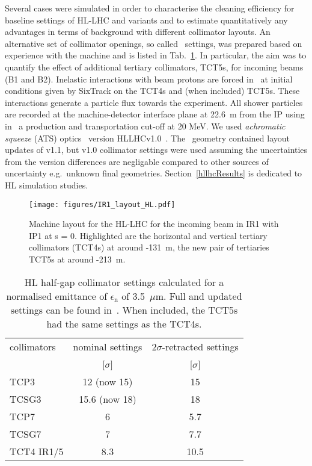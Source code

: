 Several cases were simulated in order to characterise the cleaning efficiency for baseline settings of HL-LHC and variants and to estimate quantitatively any advantages in terms of background with different collimator layouts. An alternative set of collimator openings, so called \twosigmaret~settings, was prepared based on experience with the machine and is listed in Tab.~\ref{HLcollSettings}. In particular, the aim was to quantify the effect of additional tertiary collimators, TCT5s, for incoming beams (B1 and B2). Inelastic interactions with beam protons are forced in \fluka~at initial conditions given by SixTrack on the TCT4s and (when included) TCT5s. These interactions generate a particle flux towards the experiment. All shower particles are recorded at the machine-detector interface plane at 22.6~m from the IP using in \fluka~a production and transportation cut-off at 20 MeV. We used \textit{achromatic squeeze} (ATS) optics~\cite{ATSref} version HLLHCv1.0~\cite{opticsWebRef}. The \fluka~geometry contained layout updates of v1.1, but v1.0 collimator settings were used assuming the uncertainties from the version differences are negligable compared to other sources of uncertainty e.g.~unknown final geometries. Section~\ref{hllhcResults} is dedicated to HL simulation studies.

\begin{figure}%
\begin{center}
\texttt{[image: figures/IR1\_layout\_HL.pdf]}
\end{center}
\vspace{-0.6cm}
 \caption{Machine layout for the HL-LHC for the incoming beam in IR1 with IP1 at s = 0. Highlighted are the horizontal and vertical tertiary collimators (TCT4s) at around -131~m, the new pair of tertiaries TCT5s at around -213~m.
  \label{hllhc_layout}}
\end{figure}


 \begin{table}%
   \centering
   \caption{HL half-gap collimator settings calculated for a normalised emittance of $\epsilon_{\mathrm{n}}$ of 3.5~$\mu$m. Full and updated settings can be found in~\cite{collSettRef}. When included, the TCT5s had the same settings as the TCT4s.}

   \begin{tabular}{l|c|c}
       \hline
       collimators &        nominal settings & $2\sigma$-retracted settings\\
                   &         [$\sigma$] &  [$\sigma$]\\
       \hline
       TCP3 & 12 (now 15) & 15 \\
       TCSG3 & 15.6 (now 18)& 18 \\
       TCP7 & 6 & 5.7 \\
       TCSG7 & 7 & 7.7 \\
       TCT4 IR1/5 & 8.3 & 10.5 \\
       \hline
   \end{tabular}
   \label{HLcollSettings}
\end{table}

